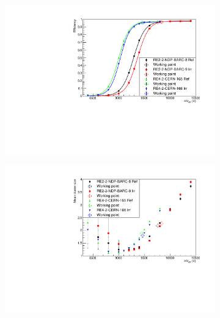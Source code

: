 	\begin{figure}[H]
    	\begin{subfigure}{0.5\linewidth}
			\centering
    		\includegraphics[width = 0.7\plotwidth]{fig/chapt5/Consolidation-Efficiency.pdf}
        	\caption{\label{fig:consolidation:A}}
    	\end{subfigure}
    	\begin{subfigure}{0.5\linewidth}
			\centering
    		\includegraphics[width = 0.7\plotwidth]{fig/chapt5/Consolidation-Cluster-Size.pdf}
        	\caption{\label{fig:consolidation:B}}
    	\end{subfigure}
    	\begin{subfigure}{0.5\linewidth}
			\centering

\end{subfigure}
\end{figure}
